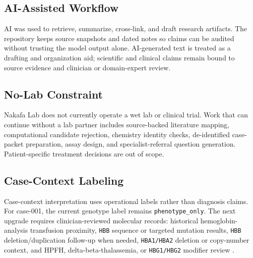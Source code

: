 \subsection{AI-Assisted Workflow}

AI was used to retrieve, summarize, cross-link, and draft research artifacts.
The repository keeps source snapshots and dated notes so claims can be audited
without trusting the model output alone. AI-generated text is treated as a
drafting and organization aid; scientific and clinical claims remain bound to
source evidence and clinician or domain-expert review.

\subsection{No-Lab Constraint}

Nakafa Lab does not currently operate a wet lab or clinical trial. Work that can
continue without a lab partner includes source-backed literature mapping,
computational candidate rejection, chemistry identity checks, de-identified
case-packet preparation, assay design, and specialist-referral question
generation. Patient-specific treatment decisions are out of scope.

\subsection{Case-Context Labeling}

Case-context interpretation uses operational labels rather than diagnosis
claims. For case-001, the current genotype label remains
\texttt{phenotype\_only}. The next upgrade requires clinician-reviewed molecular
records: historical hemoglobin-analysis transfusion proximity, \texttt{HBB}
sequence or targeted mutation results, \texttt{HBB} deletion/duplication
follow-up when needed, \texttt{HBA1/HBA2} deletion or copy-number context, and
HPFH, delta-beta-thalassemia, or \texttt{HBG1/HBG2} modifier review
\cite{geneReviewsBetaThalassemia,geneReviewsAlphaThalassemia}.
